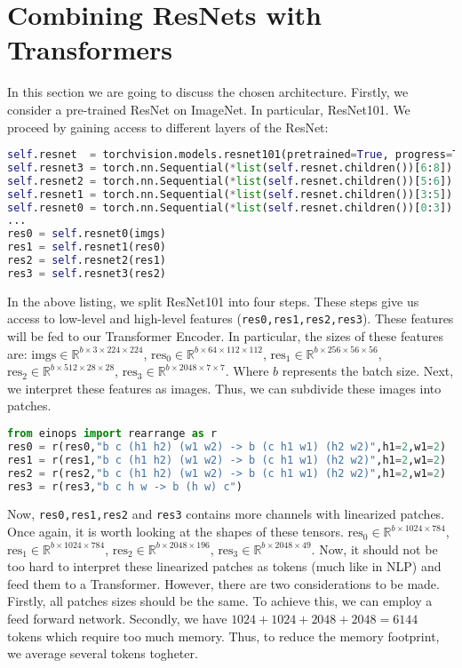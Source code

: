 \section{Combining ResNets with Transformers}\label{sect:architecture}

In this section we are going to discuss the chosen architecture. Firstly, we consider a pre-trained ResNet on ImageNet. In particular, ResNet101. We proceed by gaining access to different layers of the ResNet:

\begin{lstlisting}[language=Python]
self.resnet  = torchvision.models.resnet101(pretrained=True, progress=True)
self.resnet3 = torch.nn.Sequential(*list(self.resnet.children())[6:8])
self.resnet2 = torch.nn.Sequential(*list(self.resnet.children())[5:6])
self.resnet1 = torch.nn.Sequential(*list(self.resnet.children())[3:5])
self.resnet0 = torch.nn.Sequential(*list(self.resnet.children())[0:3])
...
res0 = self.resnet0(imgs)
res1 = self.resnet1(res0)
res2 = self.resnet2(res1)
res3 = self.resnet3(res2)
\end{lstlisting}

In the above listing, we split ResNet101 into four steps. These steps give us access to low-level and high-level features (\texttt{res0,res1,res2,res3}). These features will be fed to our Transformer Encoder. In particular, the sizes of these features are: $\text{imgs}\in\mathbb{R}^{b\times 3\times 224\times224}$, $\text{res}_0\in\mathbb{R}^{b\times64\times 112 \times 112}$, $\text{res}_1\in\mathbb{R}^{b\times256\times 56\times 56}$, $\text{res}_2\in\mathbb{R}^{b\times512\times 28\times 28}$, $\text{res}_3\in\mathbb{R}^{b\times2048 \times 7\times 7}$. Where $b$ represents the batch size. Next, we interpret these features as images. Thus, we can subdivide these images into patches.

\begin{lstlisting}[language=Python]
from einops import rearrange as r
res0 = r(res0,"b c (h1 h2) (w1 w2) -> b (c h1 w1) (h2 w2)",h1=2,w1=2)
res1 = r(res1,"b c (h1 h2) (w1 w2) -> b (c h1 w1) (h2 w2)",h1=2,w1=2)
res2 = r(res2,"b c (h1 h2) (w1 w2) -> b (c h1 w1) (h2 w2)",h1=2,w1=2)
res3 = r(res3,"b c h w -> b (h w) c")
\end{lstlisting}

Now, \texttt{res0,res1,res2} and \texttt{res3} contains more channels with linearized patches. Once again, it is worth looking at the shapes of these tensors. $\text{res}_0\in\mathbb{R}^{b\times1024\times784}$, $\text{res}_1\in\mathbb{R}^{b\times1024\times784}$, $\text{res}_2\in\mathbb{R}^{b\times2048\times196}$, $\text{res}_3\in\mathbb{R}^{b\times2048\times49}$. Now, it should not be too hard to interpret these linearized patches as tokens (much like in NLP) and feed them to a Transformer. However, there are two considerations to be made. Firstly, all patches sizes should be the same. To achieve this, we can employ a feed forward network. Secondly, we have $1024+1024+2048+2048=6144$ tokens which require too much memory. Thus, to reduce the memory footprint, we average several tokens togheter.

